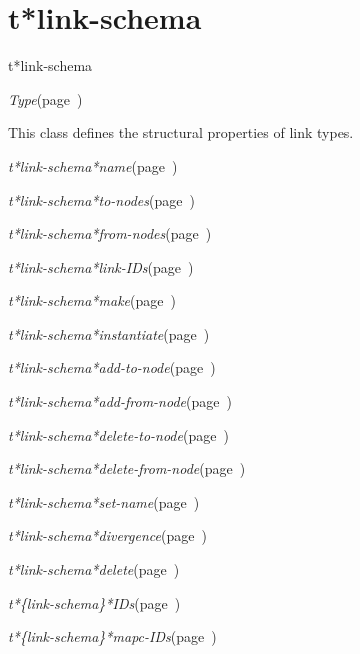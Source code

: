\section{t*link-schema}
\label{t*link-schema}

\begin{description}
\item [Name:]  t*link-schema

\item [Layer:] {\sl Type}\hfill(page~\pageref{Type})

\item [Description:]

This class defines the structural properties of link
types.

\item [Attributes:]
\item {\sl t*link-schema*name}\hfill(page~\pageref{t*link-schema*name})
\item {\sl t*link-schema*to-nodes}\hfill(page~\pageref{t*link-schema*to-nodes})
\item {\sl t*link-schema*from-nodes}\hfill(page~\pageref{t*link-schema*from-nodes})
\item {\sl t*link-schema*link-IDs}\hfill(page~\pageref{t*link-schema*link-IDs})

\item [Operations:]
\item {\sl t*link-schema*make}\hfill(page~\pageref{t*link-schema*make})
\item {\sl t*link-schema*instantiate}\hfill(page~\pageref{t*link-schema*instantiate})
\item {\sl t*link-schema*add-to-node}\hfill(page~\pageref{t*link-schema*add-to-node})
\item {\sl t*link-schema*add-from-node}\hfill(page~\pageref{t*link-schema*add-from-node})
\item {\sl t*link-schema*delete-to-node}\hfill(page~\pageref{t*link-schema*delete-to-node})
\item {\sl t*link-schema*delete-from-node}\hfill(page~\pageref{t*link-schema*delete-from-node})
\item {\sl t*link-schema*set-name}\hfill(page~\pageref{t*link-schema*set-name})
\item {\sl t*link-schema*divergence}\hfill(page~\pageref{t*link-schema*divergence})
\item {\sl t*link-schema*delete}\hfill(page~\pageref{t*link-schema*delete})

\item {\sl t*\{link-schema\}*IDs}\hfill(page~\pageref{t*link-schema*IDs})
\item {\sl t*\{link-schema\}*mapc-IDs}\hfill(page~\pageref{t*link-schema*mapc-IDs})

\item [Subclasses:]


\item [Superclasses:]


\item [Instances:]



\end{description}
\horizontalline

